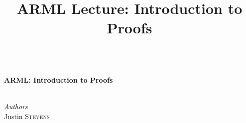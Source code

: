
\title{ARML Lecture:  Introduction to Proofs}

\begin{center}
\HRule \\[0.4cm]
{ \huge \bfseries ARML: Introduction to Proofs}\\[0.4cm] %
\HRule \\[1.5cm]
\begin{minipage}{0.4\textwidth}
\begin{flushleft} \large
\emph{Authors}\\
Justin \textsc{Stevens} \newline
\end{flushleft}
\end{minipage}
~
\begin{minipage}{0.4\textwidth}
\begin{flushright} \large

\end{flushright}
\end{minipage}\\[0.5cm]
\end{center}

